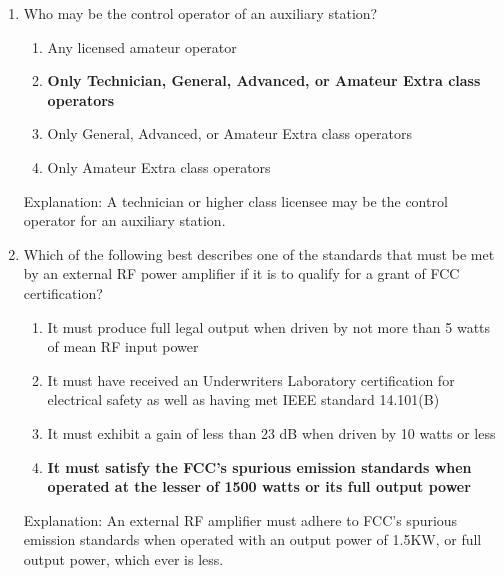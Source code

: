\begin{enumerate}
      \item Who may be the control operator of an auxiliary station?
        \begin{enumerate}
          \item Any licensed amateur operator
          \item \textbf {Only Technician, General, Advanced, or Amateur Extra class operators}
        \item  Only General, Advanced, or Amateur Extra class operators
         \item  Only Amateur Extra class operators
        \end{enumerate}
     \textcolor{myred}{Explanation:}
       A technician or higher class licensee may be the control operator for an auxiliary station.
       
      \item Which of the following best describes one of the standards that must be met by an external RF power amplifier if it is to qualify for a grant of FCC certification?
         \begin{enumerate}
       \item It must produce full legal output when driven by not more than 5 watts of mean RF input power
      \item  It must have received an Underwriters Laboratory certification for electrical safety as well as having met IEEE standard 14.101(B)
        \item  It must exhibit a gain of less than 23 dB when driven by 10 watts or less
     \item \textbf {It must satisfy the FCC's spurious emission standards when operated at the lesser of 1500 watts or its full output power}
        \end{enumerate}
          \textcolor{myred}{Explanation:}
    An external RF amplifier must adhere to FCC's spurious emission standards when operated with an output power of 1.5KW, or full output power, which ever is less.
\end{enumerate}

